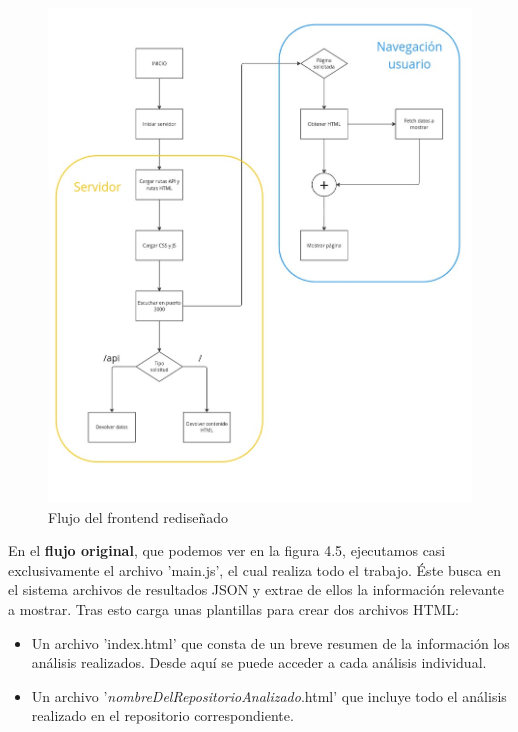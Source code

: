 \documentclass[a4paper, 12pt]{book}
\begin{document}
\begin{figure} [H]
    \centering
    \includegraphics[width=\textwidth, height=\textheight, keepaspectratio]{img/esquema_frontend_final.jpg}
    \caption{Flujo del frontend rediseñado}
    \label{fig:final_frontend}
\end{figure}

En el \textbf{flujo original}, que podemos ver en la figura 4.5, ejecutamos casi exclusivamente el archivo 'main.js', el cual realiza todo el trabajo. Éste busca en el sistema archivos de resultados JSON y extrae de ellos la información relevante a mostrar. Tras esto carga unas plantillas para crear dos archivos HTML:

\begin{itemize}
    \item Un archivo 'index.html' que consta de un breve resumen de la información los análisis realizados. Desde aquí se puede acceder a cada análisis individual.
    \item Un archivo '\textit{nombreDelRepositorioAnalizado}.html' que incluye todo el análisis realizado en el repositorio correspondiente.
\end{itemize}
\end{document}
